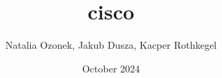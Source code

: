 \documentclass{article}
\title{cisco}
\author{Natalia Ozonek, Jakub Dusza, Kacper Rothkegel}
\date{October 2024}
\begin{document}
\maketitle{}



\end{document}
